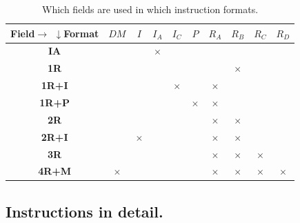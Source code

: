 \documentclass[12pt,english,twoside]{report}
\def\checkmark{\ensuremath{\times}}
\begin{document}
\begin{table}[p]
  \begin{center}
    \begin{tabular}{c||c|c|c|c|c|c|c|c|c}
      \makecell{Field$\rightarrow$ \\ $\downarrow$Format} & $DM$ & $I$ & $I_A$ & $I_C$ & $P$ & $R_A$ & $R_B$ & $R_C$ & $R_D$ \\
      \hline
      \textbf{IA} & & & \checkmark & & & & & &\\
      \hline
      \textbf{1R} & & & & & & & \checkmark & &\\
      \hline
      \textbf{1R+I} & & & & \checkmark & & \checkmark & & &\\
      \hline
      \textbf{1R+P} & & & & & \checkmark & \checkmark & & &\\
      \hline
      \textbf{2R} & & & & & & \checkmark & \checkmark & &\\
      \hline
      \textbf{2R+I} & & \checkmark & & & & \checkmark & \checkmark & &\\
      \hline
      \textbf{3R} & & & & & & \checkmark & \checkmark & \checkmark &\\
      \hline
      \textbf{4R+M} & \checkmark & & & & & \checkmark & \checkmark & \checkmark & \checkmark
    \end{tabular}
  \caption{\label{tab:FormatsAndFields} Which fields are used in which instruction formats.}
  \end{center}
\end{table}

\subsection{Instructions in detail.}
\end{document}
